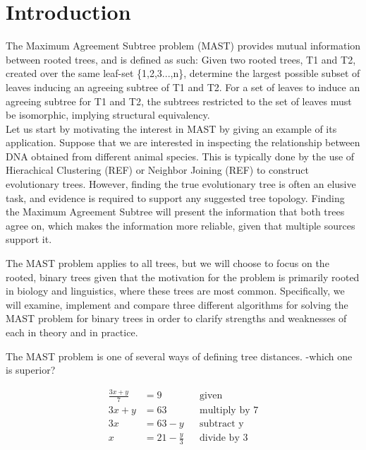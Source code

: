 \chapter{Introduction}
\label{ch:intro}
The Maximum Agreement Subtree problem (MAST) provides mutual information between rooted trees, and is defined as such: Given two rooted trees, T1 and T2, created over the same leaf-set \{1,2,3...,n\}, determine the largest possible subset of leaves inducing an agreeing subtree of T1 and T2. For a set of leaves to induce an agreeing subtree for T1 and T2, the subtrees restricted to the set of leaves must be isomorphic, implying structural equivalency.
\\

Let us start by motivating the interest in MAST by giving an example of its application. Suppose that we are interested in inspecting the relationship between DNA obtained from different animal species. This is typically done by the use of  Hierachical Clustering (REF) or Neighbor Joining (REF) to construct evolutionary trees. However, finding the true evolutionary tree is often an elusive task, and evidence is required to support any suggested tree topology. Finding the Maximum Agreement Subtree will present the information that both trees agree on, which makes the information more reliable, given that multiple sources support it. 

The MAST problem applies to all trees, but we will choose to focus on the rooted, binary trees given that the motivation for the problem is primarily rooted in biology and linguistics, where these trees are most common. Specifically, we will examine, implement and compare three different algorithms for solving the MAST problem for binary trees in order to clarify strengths and weaknesses of each in theory and in practice.     



The MAST problem is one of several ways of defining tree distances. -which one is superior?


\begin{align*}
	\frac{3x + y}{7} &= 9  && \text{given}   \\
	3x + y &= 63           && \text{multiply by 7}   \\
	3x &= 63 - y           && \text{subtract y}   \\
	x &= 21 - \frac{y}{3}  && \text{divide by 3}   \\
\end{align*}




